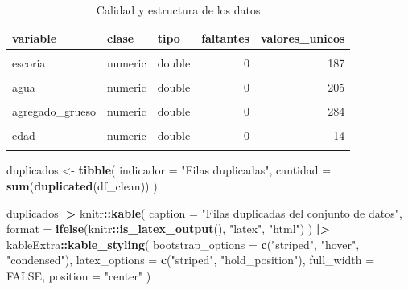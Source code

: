 \documentclass[
]{book}
\newenvironment{Shaded}{\begin{snugshade}}{\end{snugshade}}
\newcommand{\AttributeTok}[1]{\textcolor[rgb]{0.13,0.29,0.53}{#1}}
\newcommand{\ConstantTok}[1]{\textcolor[rgb]{0.56,0.35,0.01}{#1}}
\newcommand{\FunctionTok}[1]{\textcolor[rgb]{0.13,0.29,0.53}{\textbf{#1}}}
\newcommand{\NormalTok}[1]{#1}
\newcommand{\OtherTok}[1]{\textcolor[rgb]{0.56,0.35,0.01}{#1}}
\newcommand{\SpecialCharTok}[1]{\textcolor[rgb]{0.81,0.36,0.00}{\textbf{#1}}}
\newcommand{\StringTok}[1]{\textcolor[rgb]{0.31,0.60,0.02}{#1}}
\begin{document}
\begin{table}[!h]
\centering
\caption{\label{tab:calidad-datos}Calidad y estructura de los datos}
\centering
\begin{tabular}[t]{l|l|l|r|r}
\hline
variable & clase & tipo & faltantes & valores\_unicos\\
\hline
\cellcolor{gray!10}{cemento} & \cellcolor{gray!10}{numeric} & \cellcolor{gray!10}{double} & \cellcolor{gray!10}{0} & \cellcolor{gray!10}{280}\\
\hline
escoria & numeric & double & 0 & 187\\
\hline
\cellcolor{gray!10}{ceniza} & \cellcolor{gray!10}{numeric} & \cellcolor{gray!10}{double} & \cellcolor{gray!10}{0} & \cellcolor{gray!10}{163}\\
\hline
agua & numeric & double & 0 & 205\\
\hline
\cellcolor{gray!10}{superplast} & \cellcolor{gray!10}{numeric} & \cellcolor{gray!10}{double} & \cellcolor{gray!10}{0} & \cellcolor{gray!10}{155}\\
\hline
agregado\_grueso & numeric & double & 0 & 284\\
\hline
\cellcolor{gray!10}{agregado\_fino} & \cellcolor{gray!10}{numeric} & \cellcolor{gray!10}{double} & \cellcolor{gray!10}{0} & \cellcolor{gray!10}{304}\\
\hline
edad & numeric & double & 0 & 14\\
\hline
\cellcolor{gray!10}{resistencia} & \cellcolor{gray!10}{numeric} & \cellcolor{gray!10}{double} & \cellcolor{gray!10}{0} & \cellcolor{gray!10}{938}\\
\hline
\end{tabular}
\end{table}

\begin{Shaded}
\begin{Highlighting}[]
\NormalTok{duplicados }\OtherTok{\textless{}{-}} \FunctionTok{tibble}\NormalTok{(}
  \AttributeTok{indicador =} \StringTok{"Filas duplicadas"}\NormalTok{,}
  \AttributeTok{cantidad =} \FunctionTok{sum}\NormalTok{(}\FunctionTok{duplicated}\NormalTok{(df\_clean))}
\NormalTok{)}

\NormalTok{duplicados }\SpecialCharTok{|\textgreater{}}
\NormalTok{  knitr}\SpecialCharTok{::}\FunctionTok{kable}\NormalTok{(}
    \AttributeTok{caption =} \StringTok{"Filas duplicadas del conjunto de datos"}\NormalTok{,}
    \AttributeTok{format =} \FunctionTok{ifelse}\NormalTok{(knitr}\SpecialCharTok{::}\FunctionTok{is\_latex\_output}\NormalTok{(), }\StringTok{"latex"}\NormalTok{, }\StringTok{"html"}\NormalTok{)}
\NormalTok{  ) }\SpecialCharTok{|\textgreater{}}
\NormalTok{  kableExtra}\SpecialCharTok{::}\FunctionTok{kable\_styling}\NormalTok{(}
    \AttributeTok{bootstrap\_options =} \FunctionTok{c}\NormalTok{(}\StringTok{"striped"}\NormalTok{, }\StringTok{"hover"}\NormalTok{, }\StringTok{"condensed"}\NormalTok{),}
    \AttributeTok{latex\_options =} \FunctionTok{c}\NormalTok{(}\StringTok{"striped"}\NormalTok{, }\StringTok{"hold\_position"}\NormalTok{),}
    \AttributeTok{full\_width =} \ConstantTok{FALSE}\NormalTok{,}
    \AttributeTok{position =} \StringTok{"center"}
\NormalTok{  )}
\end{Highlighting}
\end{Shaded}
\end{document}
